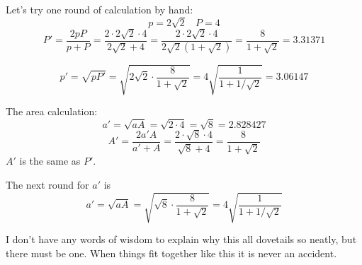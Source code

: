 \documentclass[11pt, oneside]{article}
\begin{document}
Let's try one round of calculation by hand:
\[ p = 2 \sqrt{2} \ \ \ \ P = 4 \]
\[  P' = \frac{2pP}{p + P} = \frac{2 \cdot 2 \sqrt{2} \cdot 4}{ 2 \sqrt{2} + 4} = \frac{2 \cdot 2 \sqrt{2} \cdot 4}{ 2 \sqrt{2}(1 + \sqrt{2})} = \frac{8}{1 + \sqrt{2}} = 3.31371  \]

\[ p' = \sqrt{pP'} = \sqrt{2 \sqrt{2} \cdot \frac{8}{1 + \sqrt{2}}} = 4 \sqrt{\frac{1}{1 +1/ \sqrt{2}} } = 3.06147 \]

The area calculation:
\[ a' =  \sqrt{aA} = \sqrt{2 \cdot 4} = \sqrt{8} = 2.828427 \]
\[ A' = \frac{2a'A}{a' + A} =  \frac{2 \cdot \sqrt{8}\cdot 4}{\sqrt{8} + 4} =  \frac{8}{1 + \sqrt{2}} \]
$A'$ is the same as $P'$.

The next round for $a'$ is
\[ a' =  \sqrt{aA} = \sqrt{ \sqrt{8} \cdot  \frac{8}{1 + \sqrt{2}}} = 4 \sqrt{ \frac{1}{1 + 1/ \sqrt{2}}} \]

I don't have any words of wisdom to explain why this all dovetails so neatly, but there must be one.  When things fit together like this it is never an accident.
\end{document}
